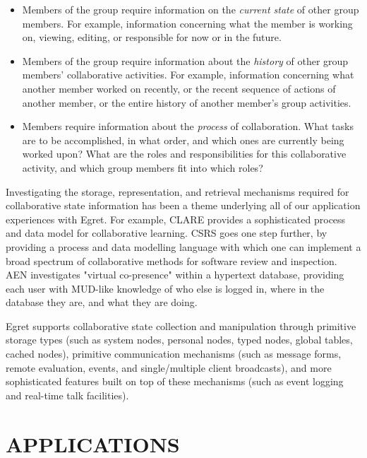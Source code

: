 \begin{itemize}

\item Members of the group require information on the {\em current
  state} of other group members. For example, information
  concerning what the member is working on, viewing, editing, or
  responsible for now or in the future.

\item Members of the group require information about the {\em history}
  of other group members' collaborative activities. For example,
  information concerning what another member worked on recently, or
  the recent sequence of actions of another member, or the entire
  history of another member's group activities.

\item Members require information about the {\em process} of
  collaboration. What tasks are to be accomplished, in what order, and
  which ones are currently being worked upon?  What are the roles and
  responsibilities for this collaborative activity, and which group
  members fit into which roles?

\end{itemize}

Investigating the storage, representation, and retrieval mechanisms
required for collaborative state information has been a theme underlying
all of our application experiences with Egret. For example, CLARE provides
a sophisticated process and data model for collaborative learning.  CSRS
goes one step further, by providing a process and data modelling language
with which one can implement a broad spectrum of collaborative methods for
software review and inspection.  AEN investigates "virtual co-presence"
within a hypertext database, providing each user with MUD-like knowledge of
who else is logged in, where in the database they are, and what they are
doing.

Egret supports collaborative state collection and manipulation through
primitive storage types (such as system nodes, personal nodes, typed nodes,
global tables, cached nodes), primitive communication mechanisms (such as
message forms, remote evaluation, events, and single/multiple client
broadcasts), and more sophisticated features built on top of these
mechanisms (such as event logging and real-time talk facilities).


\section{APPLICATIONS}

